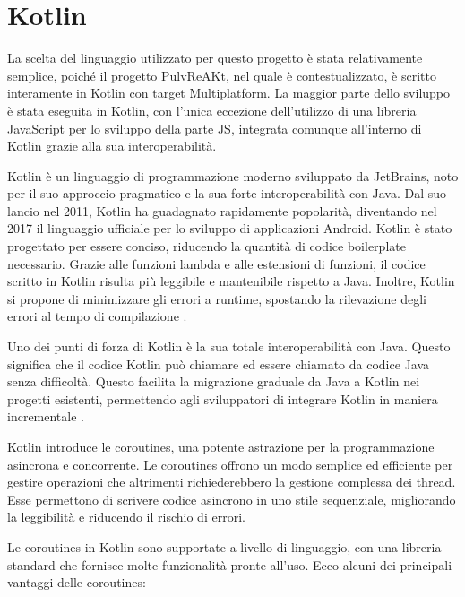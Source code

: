 \documentclass[12pt,a4paper,openright,twoside]{book}
\begin{document}
\section{Kotlin}
La scelta del linguaggio utilizzato per questo progetto è stata relativamente semplice, poiché il progetto PulvReAKt, nel quale è contestualizzato, 
è scritto interamente in Kotlin con target Multiplatform. La maggior parte dello sviluppo è stata eseguita in Kotlin, con l'unica eccezione dell'utilizzo di una libreria 
JavaScript per lo sviluppo della parte \ac{JS}, integrata comunque all'interno di Kotlin grazie alla sua interoperabilità.

Kotlin è un linguaggio di programmazione moderno sviluppato da JetBrains, noto per il suo approccio pragmatico e la sua forte interoperabilità con Java. 
Dal suo lancio nel 2011, Kotlin ha guadagnato rapidamente popolarità, diventando nel 2017 il linguaggio ufficiale per lo sviluppo di applicazioni Android. 
Kotlin è stato progettato per essere conciso, riducendo la quantità di codice boilerplate necessario. Grazie alle funzioni lambda e alle estensioni di funzioni, 
il codice scritto in Kotlin risulta più leggibile e mantenibile rispetto a Java. Inoltre, Kotlin si propone di minimizzare gli errori a runtime, 
spostando la rilevazione degli errori al tempo di compilazione \cite{kotlin-docs}.

Uno dei punti di forza di Kotlin è la sua totale interoperabilità con Java. Questo significa che il codice Kotlin può chiamare ed essere chiamato da codice Java senza difficoltà. 
Questo facilita la migrazione graduale da Java a Kotlin nei progetti esistenti, permettendo agli sviluppatori di integrare Kotlin in maniera incrementale \cite{kotlin-multiplatform}.

Kotlin introduce le coroutines, una potente astrazione per la programmazione asincrona e concorrente. Le coroutines offrono un modo semplice ed efficiente per gestire operazioni
che altrimenti richiederebbero la gestione complessa dei thread. Esse permettono di scrivere codice asincrono in uno stile sequenziale, migliorando la leggibilità e
riducendo il rischio di errori.

Le coroutines in Kotlin sono supportate a livello di linguaggio, con una libreria standard che fornisce molte funzionalità pronte all'uso. 
Ecco alcuni dei principali vantaggi delle coroutines:
\end{document}
